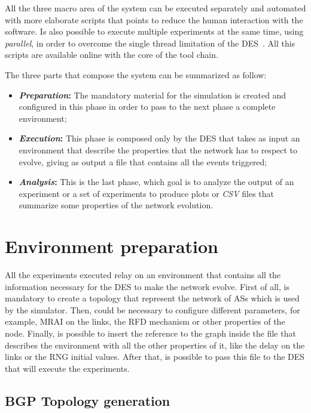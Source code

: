 All the three macro area of the system can be executed separately and automated
with more elaborate scripts that points to reduce the human interaction with the
software.
Is also possible to execute multiple experiments at the same time, using
\textit{parallel}, in order to overcome the single thread limitation of the
\ac{DES}~\cite{Tange2011a}.
All this scripts are available online with the core of the tool chain.

The three parts that compose the system can be summarized as follow:
\begin{itemize}
		\item \textbf{\textit{Preparation}:} The mandatory material for the
				simulation is created and configured in this phase in order to
				pass to the next phase a complete environment;
		\item \textbf{\textit{Execution}:} This phase is composed only by the
				\ac{DES} that takes as input an environment that describe the
				properties that the network has to respect to evolve, giving as
				output a file that contains all the events triggered;
		\item \textbf{\textit{Analysis}:} This is the last phase, which goal
				is to analyze the output of an experiment or a set of experiments
				to produce plots or \textit{CSV} files that summarize some
				properties of the network evolution.
\end{itemize}

\section{Environment preparation}
\label{sec:exp_prep}

All the experiments executed relay on an environment that contains all
the information necessary for the \ac{DES} to make the network evolve.
First of all, is mandatory to create a topology that represent the network
of \acp{AS} which is used by the simulator.
Then, could be necessary to configure
different parameters, for example, \ac{MRAI} on the links, the
\ac{RFD} mechanism or other properties of the node.
Finally, is possible to insert the reference to the graph inside the file that
describes the environment with all the other properties of it, like the delay
on the links or the \ac{RNG} initial values.
After that, is possible to pass this file to the \ac{DES} that will execute
the experiments.

\subsection{BGP Topology generation}
\label{subsec:exp_topology_generation}

